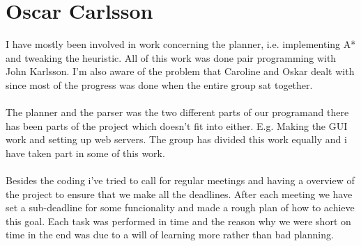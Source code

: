 \section*{Oscar Carlsson}
I have mostly been involved in work concerning the planner, i.e. implementing A* and tweaking the heuristic. All of this work was done pair programming with John Karlsson. I'm also aware of the problem that Caroline and Oskar dealt with since most of the progress was done when the entire group sat together. \\\\
The planner and the parser was the two different parts of our programand there has been parts of the project which doesn't fit into either. E.g. Making the GUI work and setting up web servers. The group has divided this work equally and i have taken part in some of this work.\\\\
Besides the coding i've tried to call for regular meetings and having a overview of the project to ensure that we make all the deadlines. 
After each meeting we have set a sub-deadline for some funcionality and made a rough plan of how to achieve this goal. Each task was performed in time and the reason why we were short on time in the end was due to a will of learning more rather than bad planning. 

